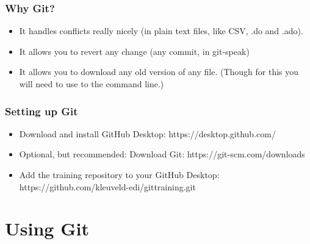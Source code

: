 \documentclass{beamer}
\begin{document}

\begin{frame}
	\frametitle{Why Git?}
	\begin{itemize}
		\item It handles conflicts really nicely (in plain text files, like CSV, .do and .ado).
		\item It allows you to revert any change (any commit, in git-speak)
		\item It allows you to download any old version of any file. (Though for this you will need to use to the command line.)
	\end{itemize}
\end{frame}


\begin{frame}
\frametitle{Setting up Git}
	\begin{itemize}
		\item Download and install GitHub Desktop: https://desktop.github.com/
		\item Optional, but recommended: Download Git: https://git-scm.com/downloads 
		\item Add the training repository to your GitHub Desktop: https://github.com/kleuveld-edi/gittraining.git
	\end{itemize}
\end{frame}

\section{Using Git} %
\end{document}

